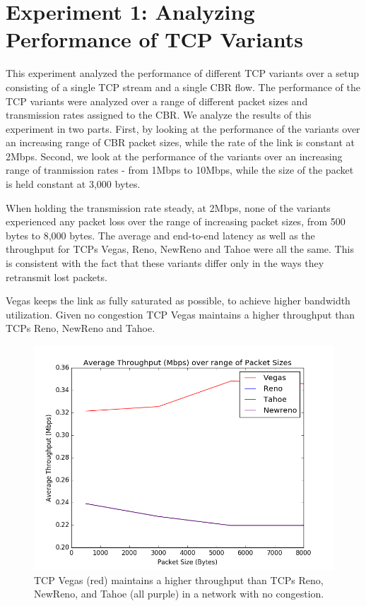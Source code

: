 \section{Experiment 1: Analyzing Performance of TCP Variants}
This experiment analyzed the performance of different TCP variants over a setup consisting of a single TCP stream and a single CBR flow. The performance of the TCP variants were analyzed over a range of different packet sizes and transmission rates assigned to the CBR. We analyze the results of this experiment in two parts. First, by looking at the performance of the variants over an increasing range of CBR packet sizes, while the rate of the link is constant at 2Mbps. Second, we look at the performance of the variants over an increasing range of tranmission rates - from 1Mbps to 10Mbps, while the size of the packet is held constant at 3,000 bytes.

When holding the transmission rate steady, at 2Mbps, none of the variants experienced any packet loss over the range of increasing packet sizes, from 500 bytes to 8,000 bytes. The average and end-to-end latency as well as the throughput for TCPs Vegas, Reno, NewReno and Tahoe were all the same. This is consistent with the fact that these variants differ only in the ways they retransmit lost packets. 

Vegas keeps the link as fully saturated as possible, to achieve higher bandwidth utilization. Given no congestion TCP Vegas maintains a higher throughput than TCPs Reno, NewReno and Tahoe. 

\begin{figure}[!htbp]
	\includegraphics[scale=0.4]{P1.png}
	\caption{TCP Vegas (red) maintains a higher throughput than TCPs Reno, NewReno, and Tahoe (all purple) in a network with no congestion.}
	\label{a:label}
\end{figure}

